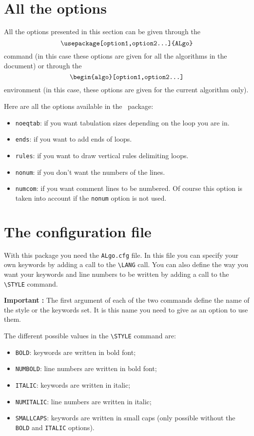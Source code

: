 \documentclass{article}
\begin{document}
\section{All the options}

All the options presented in this section can be given through the 
$$\verb!\usepackage[option1,option2...]{ALgo}!$$ command (in this case
these options are given for all the algorithms in the document) or 
through the $$\verb!\begin{algo}[option1,option2...]!$$ environment (in this
case, these options are given for the current algorithm only). 

Here are all the options available in the \ALgo\ package:
\begin{itemize}
\item
	\verb!noeqtab!: if you want tabulation sizes depending on 
			the loop you are in.
\item
	\verb!ends!: if you want to add ends of loops.
\item
	\verb!rules!: if you want to draw vertical rules delimiting loops.
\item
	\verb!nonum!: if you don't want the numbers of the lines.
\item
	\verb!numcom!: if you want comment lines to be numbered. Of course this option is taken into account if the \verb!nonum! option is not used. 
\end{itemize}

\section{The configuration file}

With this package you need the \verb!ALgo.cfg! file. In this file you can 
 specify your own keywords by adding a call to the \verb!\LANG! call. 
You can also define the way you want your keywords and line numbers to be 
written by adding a call to the \verb!\STYLE! command.

\textbf{Important : } The first argument of each of the two commands define 
 the name of the style or the keywords set. It is this name you need to give 
 as an option to use them.   

The different possible values in the \verb!\STYLE! command are:
\begin{itemize}
\item
	\verb!BOLD!: keywords are written in bold font;
\item
	\verb!NUMBOLD!: line numbers are written in bold font;
\item
	\verb!ITALIC!: keywords are written in italic;
\item
	\verb!NUMITALIC!: line numbers are written in italic;
\item
	\verb!SMALLCAPS!: keywords are written in small caps (only possible
without the \verb!BOLD! and \verb!ITALIC! options).
\end{itemize}
\end{document}
